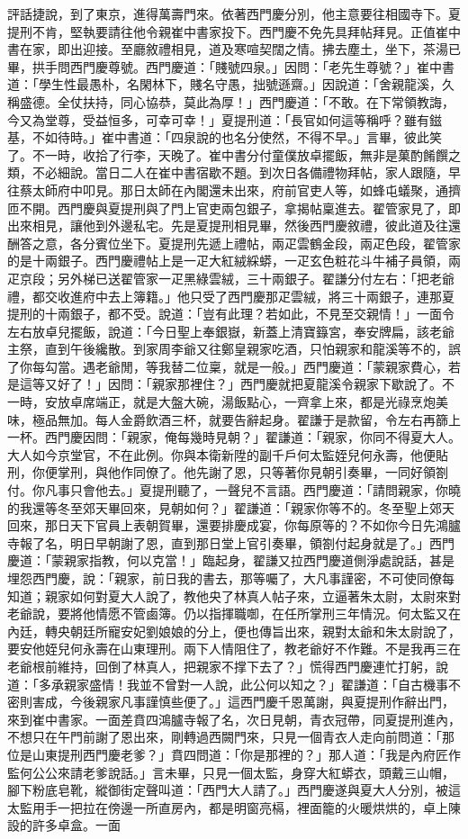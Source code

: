 評話捷說，到了東京，進得萬壽門來。依著西門慶分別，他主意要往相國寺下。夏提刑不肯，堅執要請往他令親崔中書家投下。西門慶不免先具拜帖拜見。正值崔中書在家，即出迎接。至廳敘禮相見，道及寒喧契闊之情。拂去塵土，坐下，茶湯已畢，拱手問西門慶尊號。西門慶道：「賤號四泉。」因問：「老先生尊號？」崔中書道：「學生性最愚朴，名閑林下，賤名守愚，拙號遜齋。」因說道：「舍親龍溪，久稱盛德。全仗扶持，同心協恭，莫此為厚！」西門慶道：「不敢。在下常領教誨，今又為堂尊，受益恒多，可幸可幸！」夏提刑道：「長官如何這等稱呼？雖有鎡基，不如待時。」崔中書道：「四泉說的也名分使然，不得不早。」言畢，彼此笑了。不一時，收拾了行李，天晚了。崔中書分付童僕放卓擺飯，無非是菓酌餚饌之類，不必細說。當日二人在崔中書宿歇不題。到次日各備禮物拜帖，家人跟隨，早往蔡太師府中叩見。那日太師在內閣還未出來，府前官吏人等，如蜂屯蟻聚，通擠匝不開。西門慶與夏提刑與了門上官吏兩包銀子，拿揭帖稟進去。翟管家見了，即出來相見，讓他到外邊私宅。先是夏提刑相見畢，然後西門慶敘禮，彼此道及往還酬答之意，各分賓位坐下。夏提刑先遞上禮帖，兩疋雲鶴金段，兩疋色段，翟管家的是十兩銀子。西門慶禮帖上是一疋大紅絨綵蟒，一疋玄色粧花斗牛補子員領，兩疋京段；另外梯已送翟管家一疋黑綠雲絨，三十兩銀子。翟謙分付左右：「把老爺禮，都交收進府中去上簿籍。」他只受了西門慶那疋雲絨，將三十兩銀子，連那夏提刑的十兩銀子，都不受。說道：「豈有此理？若如此，不見至交親情！」一面令左右放卓兒擺飯，說道：「今日聖上奉銀嶽，新蓋上清寶籙宮，奉安牌扁，該老爺主祭，直到午後纔散。到家周李爺又往鄭皇親家吃酒，只怕親家和龍溪等不的，誤了你每勾當。遇老爺閒，等我替二位稟，就是一般。」西門慶道：「蒙親家費心，若是這等又好了！」因問：「親家那裡住？」西門慶就把夏龍溪令親家下歇說了。不一時，安放卓席端正，就是大盤大碗，湯飯點心，一齊拿上來，都是光祿烹炮美味，極品無加。每人金爵飲酒三杯，就要告辭起身。翟謙于是款留，令左右再篩上一杯。西門慶因問：「親家，俺每幾時見朝？」翟謙道：「親家，你同不得夏大人。大人如今京堂官，不在此例。你與本衛新陞的副千戶何太監姪兒何永壽，他便貼刑，你便掌刑，與他作同僚了。他先謝了恩，只等著你見朝引奏畢，一同好領劄付。你凡事只會他去。」夏提刑聽了，一聲兒不言語。西門慶道：「請問親家，你曉的我還等冬至郊天畢回來，見朝如何？」翟謙道：「親家你等不的。冬至聖上郊天回來，那日天下官員上表朝賀畢，還要排慶成宴，你每原等的？不如你今日先鴻臚寺報了名，明日早朝謝了恩，直到那日堂上官引奏畢，領劄付起身就是了。」西門慶道：「蒙親家指教，何以克當！」臨起身，翟謙又拉西門慶道側淨處說話，甚是埋怨西門慶，說：「親家，前日我的書去，那等囑了，大凡事謹密，不可使同僚每知道；親家如何對夏大人說了，教他央了林真人帖子來，立逼著朱太尉，太尉來對老爺說，要將他情愿不管鹵簿。仍以指揮職啣，在任所掌刑三年情況。何太監又在內廷，轉央朝廷所寵安妃劉娘娘的分上，便也傳旨出來，親對太爺和朱太尉說了，要安他姪兒何永壽在山東理刑。兩下人情阻住了，教老爺好不作難。不是我再三在老爺根前維持，回倒了林真人，把親家不撑下去了？」慌得西門慶連忙打躬，說道：「多承親家盛情！我並不曾對一人說，此公何以知之？」翟謙道：「自古機事不密則害成，今後親家凡事謹慎些便了。」這西門慶千恩萬謝，與夏提刑作辭出門，來到崔中書家。一面差賁四鴻臚寺報了名，次日見朝，青衣冠帶，同夏提刑進內，不想只在午門前謝了恩出來，剛轉過西闕門來，只見一個青衣人走向前問道：「那位是山東提刑西門慶老爹？」賁四問道：「你是那裡的？」那人道：「我是內府匠作監何公公來請老爹說話。」言未畢，只見一個太監，身穿大紅蟒衣，頭戴三山帽，腳下粉底皂靴，縱御街定聲叫道：「西門大人請了。」西門慶遂與夏大人分別，被這太監用手一把拉在傍邊一所直房內，都是明窗亮槅，裡面籠的火暖烘烘的，卓上陳設的許多卓盒。一面